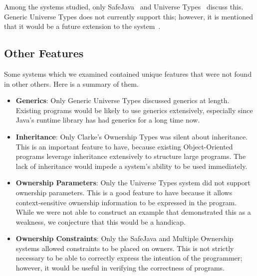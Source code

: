 \documentclass{acm_proc_article-sp}
\begin{document}
Among the systems studied, only SafeJava~\cite{boyapati04safejava} and Universe
Types~\cite{dietl07gut} discuss this. Generic Universe Types does not currently
support this; however, it is mentioned that it would be a future extension to
the system~\cite{dietl09gut}.

\subsection{Other Features}
\label{subsec:other_features}

Some systems which we examined contained unique features that were not found in
other others. Here is a summary of them.

\begin{itemize}
	\item \textbf{Generics}: Only Generic Universe Types discussed generics at
		length. Existing programs would be likely to use generics extensively,
		especially since Java's runtime library has had generics for a long
		time now.
	\item \textbf{Inheritance}: Only Clarke's Ownership Types was silent about
		inheritance.  This is an important feature to have, because existing
		Object-Oriented programs leverage inheritance extensively to structure
		large programs. The lack of inheritance would impede a system's ability
		to be used immediately.
	\item \textbf{Ownership Parameters}: Only the Universe Types system did not
		support ownership parameters. This is a good feature to have because it
		allows context-sensitive ownership information to be expressed in the
		program.  While we were not able to construct an example that
		demonstrated this as a weakness, we conjecture that this would be a
		handicap.
	\item \textbf{Ownership Constraints}: Only the SafeJava and Multiple
		\linebreak Ownership systems allowed constraints to be placed on
		owners. This is not strictly necessary to be able to correctly express
		the intention of the programmer; however, it would be useful in
		verifying the correctness of programs.
\end{itemize}
\end{document}
